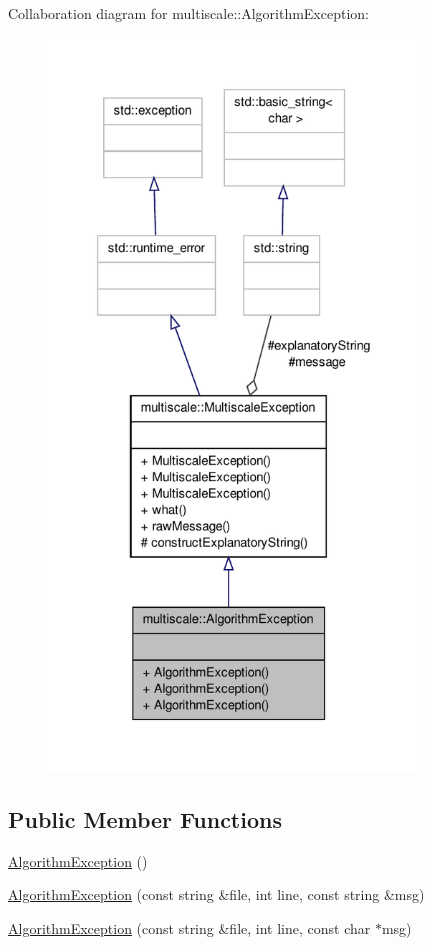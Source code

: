 Collaboration diagram for multiscale\-:\-:Algorithm\-Exception\-:\nopagebreak
\begin{figure}[H]
\begin{center}
\leavevmode
\includegraphics[height=550pt]{classmultiscale_1_1AlgorithmException__coll__graph}
\end{center}
\end{figure}
\subsection*{Public Member Functions}
\begin{DoxyCompactItemize}
\item 
\hyperlink{classmultiscale_1_1AlgorithmException_a00fc60bc858418221b1159f47bfc88a4}{Algorithm\-Exception} ()
\item 
\hyperlink{classmultiscale_1_1AlgorithmException_a82b64c1819436f13d85f1749c6f0a9a4}{Algorithm\-Exception} (const string \&file, int line, const string \&msg)
\item 
\hyperlink{classmultiscale_1_1AlgorithmException_a8e93ad9821b69a6b4ac459f76b3a82ee}{Algorithm\-Exception} (const string \&file, int line, const char $\ast$msg)
\end{DoxyCompactItemize}
